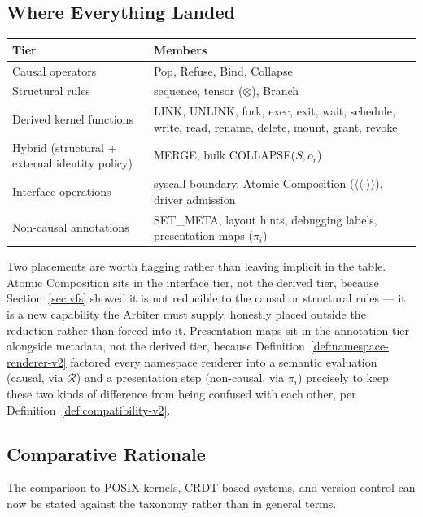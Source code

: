 \documentclass[11pt]{article}
\begin{document}
\subsection{Where Everything Landed}

\begin{center}
\begin{tabular}{@{}p{}p{}@{}}
\toprule
\textbf{Tier} & \textbf{Members} \\
\midrule
Causal operators & Pop, Refuse, Bind, Collapse \\
Structural rules & sequence, tensor ($\otimes$), Branch \\
Derived kernel functions & LINK, UNLINK, fork, exec, exit, wait, schedule, write, read, rename, delete, mount, grant, revoke \\
Hybrid (structural + external identity policy) & MERGE, bulk COLLAPSE($S,o_r$) \\
Interface operations & syscall boundary, Atomic Composition ($\langle\!\langle\cdot\rangle\!\rangle$), driver admission \\
Non-causal annotations & SET\_META, layout hints, debugging labels, presentation maps ($\pi_i$) \\
\bottomrule
\end{tabular}
\end{center}

Two placements are worth flagging rather than leaving implicit in the table. Atomic Composition sits in the interface tier, not the derived tier, because Section~\ref{sec:vfs} showed it is not reducible to the causal or structural rules --- it is a new capability the Arbiter must supply, honestly placed outside the reduction rather than forced into it. Presentation maps sit in the annotation tier alongside metadata, not the derived tier, because Definition~\ref{def:namespace-renderer-v2} factored every namespace renderer into a semantic evaluation (causal, via $\mathcal{R}$) and a presentation step (non-causal, via $\pi_i$) precisely to keep these two kinds of difference from being confused with each other, per Definition~\ref{def:compatibility-v2}.

\subsection{Comparative Rationale}

The comparison to POSIX kernels, CRDT-based systems, and version control can now be stated against the taxonomy rather than in general terms.
\end{document}
